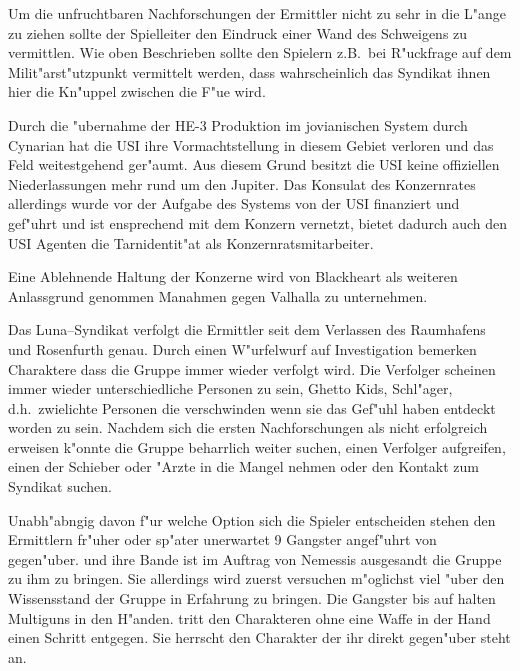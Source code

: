 \begin{remarks}
	Um die unfruchtbaren Nachforschungen der Ermittler nicht zu sehr in die L"ange zu ziehen sollte der Spielleiter den Eindruck einer Wand des Schweigens zu vermittlen. Wie oben Beschrieben sollte den Spielern z.B.~bei R"uckfrage auf dem Milit"arst"utzpunkt vermittelt werden, dass wahrscheinlich das Syndikat ihnen hier die Kn"uppel zwischen die F"u\3e wird.

	Durch die "ubernahme der HE-3 Produktion im jovianischen System durch Cynarian hat die USI ihre Vormachtstellung in diesem Gebiet verloren und das Feld weitestgehend ger"aumt. Aus diesem Grund besitzt die USI keine offiziellen Niederlassungen mehr rund um den Jupiter. Das Konsulat des Konzernrates allerdings wurde vor der Aufgabe des Systems von der USI finanziert und gef"uhrt und ist ensprechend mit dem Konzern vernetzt, bietet dadurch auch den USI Agenten die Tarnidentit"at als Konzernratsmitarbeiter.

	Eine Ablehnende Haltung der Konzerne wird von Blackheart als weiteren Anlassgrund genommen Ma\3nahmen gegen Valhalla zu unternehmen.
\end{remarks}

\newcommand{\xl}{\pinyin{Xiao3} \pinyin{Long2}}
\newcommand{\xlsn}{\pinyin{Xiao3} \pinyin{Long2}}

Das Luna--Syndikat verfolgt die Ermittler seit dem Verlassen des Raumhafens und Rosenfurth genau. Durch einen W"urfelwurf auf Investigation bemerken Charaktere dass die Gruppe immer wieder verfolgt wird. Die Verfolger scheinen immer wieder unterschiedliche Personen zu sein, Ghetto Kids, Schl"ager, d.h.~zwielichte Personen die verschwinden wenn sie das Gef"uhl haben entdeckt worden zu sein. Nachdem sich die ersten Nachforschungen als nicht erfolgreich erweisen k"onnte die Gruppe beharrlich weiter suchen, einen Verfolger aufgreifen, einen der Schieber oder "Arzte in die Mangel nehmen oder den Kontakt zum Syndikat suchen. 

Unabh"abngig davon f"ur welche Option sich die Spieler entscheiden stehen den Ermittlern fr"uher oder sp"ater unerwartet 9 Gangster angef"uhrt von \xl{} gegen"uber. \xlsn{} und ihre Bande ist im Auftrag von Nemessis ausgesandt die Gruppe zu ihm zu bringen. Sie allerdings wird zuerst versuchen m"oglichst viel "uber den Wissensstand der Gruppe in Erfahrung zu bringen. Die Gangster bis auf \xlsn{} halten Multiguns in den H"anden. \xlsn{} tritt den Charakteren ohne eine Waffe in der Hand einen Schritt entgegen. Sie herrscht den Charakter der ihr direkt gegen"uber steht an.

